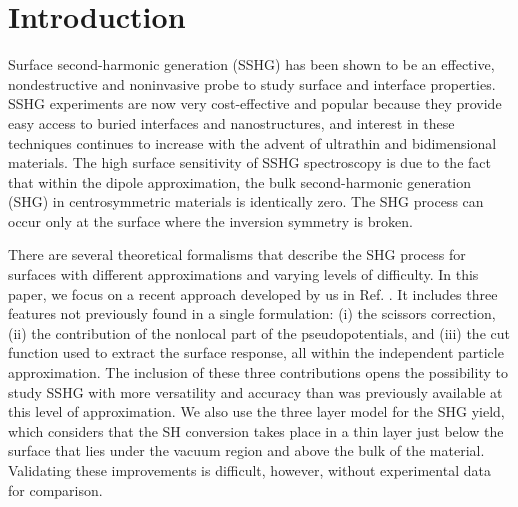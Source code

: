 \documentclass[prb,superscriptaddress,showpacs,twocolumn,letterpaper]{revtex4}
\begin{document}
\section{Introduction}\label{sec:intro}

Surface second-harmonic generation (SSHG) has been shown to be an effective,
nondestructive and noninvasive probe to study surface and interface
properties.\cite{bloembergenAPB99, chenPRL81, daumPRL93, downerPSSA01,
downerSIA01, hughesPRB96, mcgilpOE94, mcgilpSRL99, mendozaPRL98, shenNAT89} SSHG
experiments are now very cost-effective and popular because they provide easy
access to buried interfaces and nanostructures, and interest in these techniques
continues to increase with the advent of ultrathin and bidimensional
materials.\cite{deanPRB14, malardPRB13} The high surface sensitivity of SSHG
spectroscopy is due to the fact that within the dipole approximation, the bulk
second-harmonic generation (SHG) in centrosymmetric materials is identically
zero. The SHG process can occur only at the surface where the inversion symmetry
is broken.

There are several theoretical formalisms that describe the SHG process for
surfaces with different approximations and varying levels of
difficulty.\cite{mendozaPRL98, arzatePRB01, mendozaPRB01, mejiaPRB02, sanoPRB02,
mejiaRMF04, trollePRB14} In this paper, we focus on a recent approach developed
by us in Ref. . It includes three features not
previously found in a single formulation: (i) the scissors correction, (ii) the
contribution of the nonlocal part of the pseudopotentials, and (iii) the cut
function used to extract the surface response, all within the independent
particle approximation. The inclusion of these three contributions opens the
possibility to study SSHG with more versatility and accuracy than was previously
available at this level of approximation. We also use the three layer model for
the SHG yield, which considers that the SH conversion takes place in a thin layer
just below the surface that lies under the vacuum region and above the bulk of
the material. Validating these improvements is difficult, however, without
experimental data for comparison.
\end{document}
